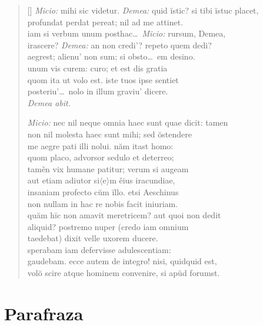 \begin{verse}[\versewidth]
    \textit{Micio:} mihi sic videtur. \textit{Demea:} quid ĭstic? si tibi ĭstuc placet,\\
    profundat perdat pereat; nil ad me attinet.\\
    iam si verbum unum posthac\dots\ \textit{Micio:} rursum, Demea,\\
    irascere? \textit{Demea:} an non credi'? repeto quem dedi?\\
    aegrest; alienu' non sum; si obsto\dots\ em desino.\\
    unum vis curem: curo; et est dis gratia\\
    quom ita ut volo est. iste tuos ipse sentiet\\
    posteriu'\dots\ nolo in illum graviu' dicere.\\

    \textit{Demea abit.}

    \textit{Micio:} nec nil neque omnia haec sunt quae dicit: tamen\\
    non nil molesta haec sunt mihi; sed ŏstendere\\
    me aegre pati illi nolui. năm itast homo:\\
    quom placo, advorsor sedulo et deterreo;\\
    taměn vix humane patitur; verum si augeam\\
    aut etiam adiutor si$\langle$e$\rangle$m ěius iracundiae,\\
    insaniam profecto cŭm ĭllo. etsi Aeschinus\\
    non nullam in hac re nobis facit iniuriam.\\
    quăm hĭc non amavit meretricem? aut quoi non dedit\\
    aliquid? postremo nuper (credo iam omnium\\
    taedebat) dixit velle uxorem ducere.\\
    sperabam iam defervisse adulescentiam:\\
    gaudebam. ecce autem de integro! nisi, quidquid est,\\
    volŏ scire atque hominem convenire, si apŭd forumst.\\
\end{verse}


\section*{Parafraza}


